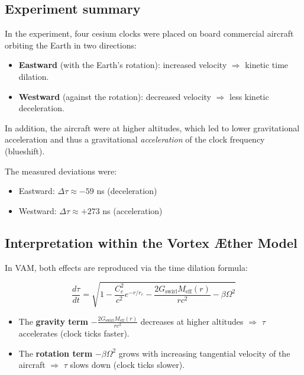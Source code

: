 \subsection{Experiment summary}

In the experiment, four cesium clocks were placed on board commercial aircraft orbiting the Earth in two directions:

\begin{itemize}
    \item \textbf{Eastward} (with the Earth's rotation): increased velocity $\Rightarrow$ kinetic time dilation.
    \item \textbf{Westward} (against the rotation): decreased velocity $\Rightarrow$ less kinetic deceleration.
\end{itemize}

In addition, the aircraft were at higher altitudes, which led to lower gravitational acceleration and thus a gravitational \emph{acceleration} of the clock frequency (blueshift).

The measured deviations were:

\begin{itemize}
    \item Eastward: $\Delta\tau \approx -59$ ns (deceleration)
    \item Westward: $\Delta\tau \approx +273$ ns (acceleration)
\end{itemize}

\subsection{Interpretation within the Vortex Æther Model}

In VAM, both effects are reproduced via the time dilation formula:

\begin{equation}
    \frac{d\tau}{dt} = \sqrt{1 - \frac{C_e^2}{c^2} e^{-r/r_c} - \frac{2G_\text{swirl} M_\text{eff}(r)}{rc^2} - \beta \Omega^2}
\end{equation}

\begin{itemize}
    \item The \textbf{gravity term} $- \frac{2G_\text{swirl} M_\text{eff}(r)}{rc^2}$ decreases at higher altitudes $\Rightarrow$ $\tau$ accelerates (clock ticks faster).
    \item The \textbf{rotation term} $-\beta \Omega^2$ grows with increasing tangential velocity of the aircraft $\Rightarrow$ $\tau$ slows down (clock ticks slower).
\end{itemize}

